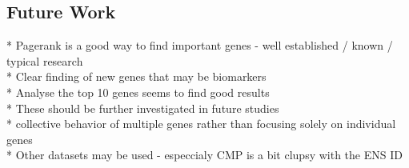 \subsection{Future Work} \label{subsec:future_work}
{\color{lightgray}
* Pagerank is a good way to find important genes - well established / known / typical research \\
* Clear finding of new genes that may be biomarkers\\
* Analyse the top 10 genes seems to find good results\\

* These should be further investigated in future studies\\
* collective behavior of multiple genes rather than focusing solely on individual genes\\
* Other datasets may be used - especcialy CMP is a bit clupsy with the ENS ID\\
}